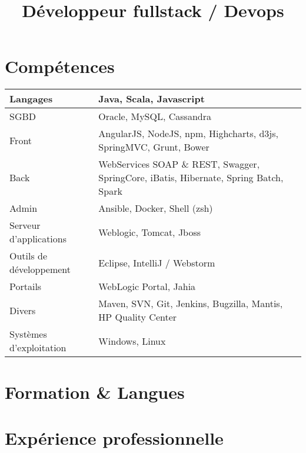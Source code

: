 \documentclass[11pt,a4paper,sans]{moderncv}        %
\title{Développeur fullstack / Devops}                               %
\begin{document}
\makecvtitle
\section{Compétences}
\begin{tabular}[t]{| p{5cm} | p{12cm} |}
  \hline  
  Langages & Java, Scala, Javascript \\
  \hline  
  SGBD & Oracle, MySQL, Cassandra \\
  \hline  
  Front & AngularJS, NodeJS, npm, Highcharts, d3js, SpringMVC, Grunt, Bower \\
  \hline 
  Back & WebServices SOAP \& REST, Swagger, SpringCore, iBatis, Hibernate, Spring Batch, Spark \\
  \hline
  Admin & Ansible, Docker, Shell (zsh) \\
  \hline
  Serveur d’applications & Weblogic, Tomcat, Jboss \\
  \hline
  Outils de développement & Eclipse, IntelliJ / Webstorm \\
  \hline  
  Portails & WebLogic Portal, Jahia \\
  \hline  
  Divers & Maven, SVN, Git, Jenkins, Bugzilla, Mantis, HP Quality Center \\
  \hline
  Systèmes d’exploitation & Windows, Linux \\
  \hline
\end{tabular}

\section{Formation \& Langues}


\section{Expérience professionnelle}
\end{document}

